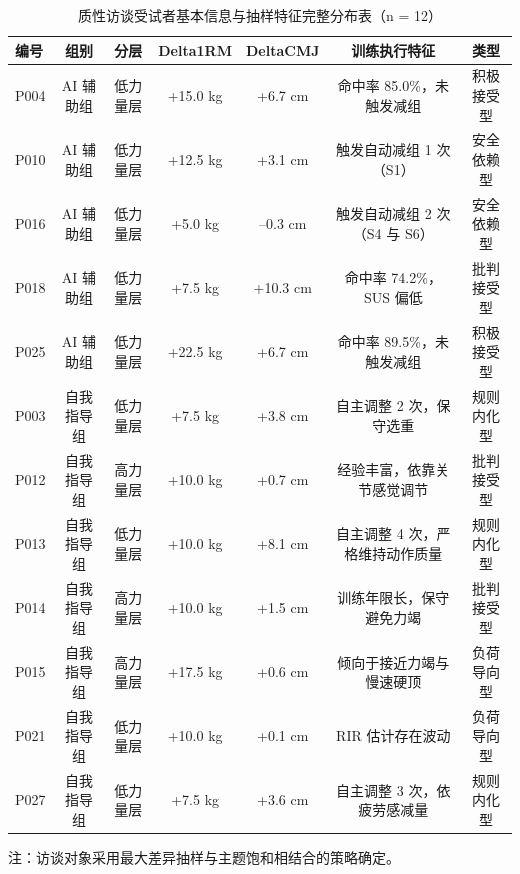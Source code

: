\begin{landscape}
\thispagestyle{empty}
\begin{table}[htbp]
\centering
\caption{质性访谈受试者基本信息与抽样特征完整分布表（n = 12）}
\label{tab:app_interview_full}
\begin{threeparttable}
\begin{tabular}{lcccccc}
\toprule
编号 & 组别 & 分层 & Delta1RM & DeltaCMJ & 训练执行特征 & 类型 \\
\midrule
P004 & AI 辅助组   & 低力量层 & +15.0 kg & +6.7 cm  & 命中率 85.0\%，未触发减组          & 积极接受型 \\
P010 & AI 辅助组   & 低力量层 & +12.5 kg & +3.1 cm  & 触发自动减组 1 次（S1）           & 安全依赖型 \\
P016 & AI 辅助组   & 低力量层 & +5.0 kg  & --0.3 cm & 触发自动减组 2 次（S4 与 S6）      & 安全依赖型 \\
P018 & AI 辅助组   & 低力量层 & +7.5 kg  & +10.3 cm & 命中率 74.2\%，SUS 偏低            & 批判接受型 \\
P025 & AI 辅助组   & 低力量层 & +22.5 kg & +6.7 cm  & 命中率 89.5\%，未触发减组          & 积极接受型 \\
P003 & 自我指导组  & 低力量层 & +7.5 kg  & +3.8 cm  & 自主调整 2 次，保守选重            & 规则内化型 \\
P012 & 自我指导组  & 高力量层 & +10.0 kg & +0.7 cm  & 经验丰富，依靠关节感觉调节          & 批判接受型 \\
P013 & 自我指导组  & 低力量层 & +10.0 kg & +8.1 cm  & 自主调整 4 次，严格维持动作质量    & 规则内化型 \\
P014 & 自我指导组  & 高力量层 & +10.0 kg & +1.5 cm  & 训练年限长，保守避免力竭          & 批判接受型 \\
P015 & 自我指导组  & 高力量层 & +17.5 kg & +0.6 cm  & 倾向于接近力竭与慢速硬顶          & 负荷导向型 \\
P021 & 自我指导组  & 低力量层 & +10.0 kg & +0.1 cm  & RIR 估计存在波动                  & 负荷导向型 \\
P027 & 自我指导组  & 低力量层 & +7.5 kg  & +3.6 cm  & 自主调整 3 次，依疲劳感减量      & 规则内化型 \\
\bottomrule
\end{tabular}
\begin{tablenotes}[flushleft]\footnotesize
\item 注：访谈对象采用最大差异抽样与主题饱和相结合的策略确定。
\end{tablenotes}
\end{threeparttable}
\end{table}
\end{landscape}

